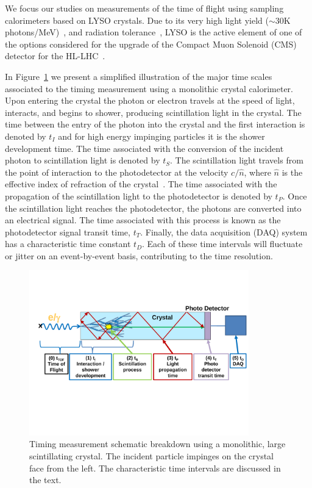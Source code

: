 \documentclass[12pt]{article}
\begin{document}
We focus our studies on measurements of the time of flight using sampling calorimeters 
based on LYSO crystals. Due to its very high light yield 
($\sim 30$K photons/MeV)~\cite{LYSOProperties}, and radiation 
tolerance~\cite{5402126, 4291695, 5402125, Dissertori:2013rma}, LYSO
is the active element of one of the options considered for the upgrade of the
Compact Muon Solenoid (CMS) detector for the HL-LHC~\cite{Contardo:1605208}. 

In Figure~\ref{fig:ScintillatorTiming} we present a simplified illustration of
the major time scales associated to the timing measurement using a monolithic
crystal calorimeter. Upon entering the crystal the photon or electron travels
at the speed of light, interacts, and begins to shower, producing scintillation light in the crystal. 
The time between the entry of the photon into the crystal and the first interaction is denoted by
$t_I$ and for high energy impinging particles it is the shower development time. 
The time associated with the conversion of the incident photon to
scintillation light is denoted by $t_S$. The scintillation light travels from
the point of interaction to the photodetector at the velocity $c/\hat{n}$, where
$\hat{n}$ is the effective index of refraction of the crystal~\cite{Moses}. The
time associated with the propagation of the scintillation light to the photodetector 
is denoted by $t_P$. Once the scintillation light reaches the photodetector, the  photons 
are converted into an electrical signal. The time associated with this process is known as the
photodetector signal transit time, $t_T$. Finally, the data acquisition (DAQ)
system has a characteristic time constant $t_D$. Each of these time intervals will fluctuate or 
jitter on an event-by-event basis, contributing to the time resolution.


\begin{figure}[h] \centering
\includegraphics[width=0.85\textwidth]{figs/ScintillatorTiming_v4}
\caption{\small Timing measurement schematic breakdown using a monolithic, large scintillating crystal. 
The incident particle impinges on the crystal face from the left. The characteristic time intervals  are discussed 
in the text.}
\label{fig:ScintillatorTiming}
\end{figure}
\end{document}
